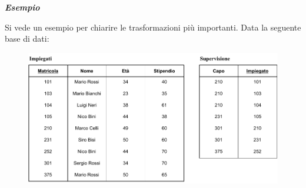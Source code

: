 \documentclass[a4paper]{article}
\begin{document}
	\noindent
	\textcolor{Green4}{\textbf{\emph{Esempio}}}\newline
	
	\noindent
	Si vede un esempio per chiarire le trasformazioni più importanti. Data la seguente base di dati:
	\begin{figure}[!htp]
		\centering
		\includegraphics[width=\textwidth]{img/equivalenza_espressioni_algebriche.pdf}
		\label{Trasformazioni di equivalenza - Tabella}
	\end{figure}
	
\end{document}
